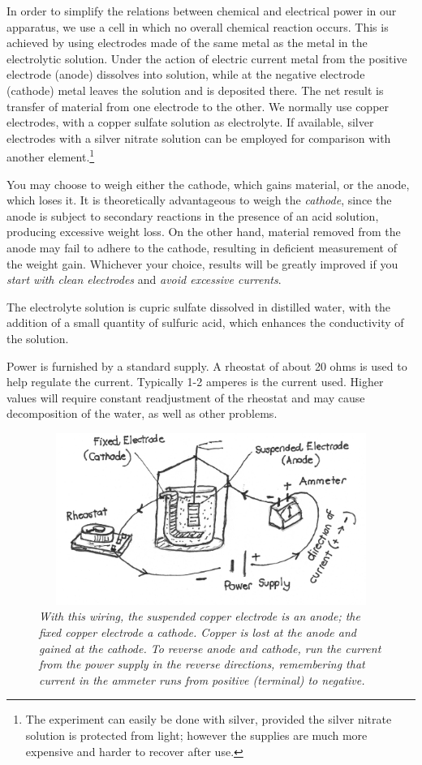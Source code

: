 In order to simplify the relations between chemical and electrical power
in our ap\-pa\-ra\-tus, we use a cell in which no overall chemical reaction
occurs. This is achieved by using electrodes made of the same metal as
the metal in the electrolytic solution. Under the action of electric
current metal from the positive electrode (anode) dissolves into
solution, while at the negative electrode (cathode) metal leaves the
solution and is deposited there. The net result is transfer of material
from one electrode to the other. We normally use copper electrodes, with
a copper sulfate solution as electrolyte. If available, silver
electrodes with a silver nitrate solution can be employed for comparison
with another element.\footnote{The experiment can easily be done with
  silver, provided the silver nitrate solution is protected from light;
  however the supplies are much more expensive and harder to recover
  after use.}

You may choose to weigh either the cathode, which gains material, or the
anode, which loses it. It is theoretically advantageous to weigh the
\emph{cathode}, since the anode is subject to secondary reactions in the
presence of an acid solution, producing excessive weight loss. On the
other hand, material removed from the anode may fail to adhere to the
cathode, resulting in deficient measurement of the weight gain.
Whichever your choice, results will be greatly improved if you
\emph{start with clean electrodes} and \emph{avoid excessive currents}.

The electrolyte solution is cupric sulfate dissolved in distilled water,
with the ad\-di\-tion of a small quantity of sulfuric acid, which enhances
the conductivity of the solution.

Power is furnished by a standard supply. A rheostat of about 20 ohms is
used to help regulate the current. Typically 1-2 amperes is the current
used. Higher values will require constant readjustment of the rheostat
and may cause de\-com\-po\-si\-tion of the water, as well as other problems.

\begin{figure}
\begin{center}
\includegraphics[width=4.88403in,height=2.20694in]{images/01_faraday/image003.png}
\caption*{\emph{With this wiring, the suspended copper electrode is an anode; the
fixed copper electrode a cathode. Copper is lost at the anode and gained at the cathode.
To reverse anode and cathode, run the current from the power
supply in the reverse directions, remembering that current in the
ammeter runs from positive (terminal) to negative.}}
\end{center}
\end{figure}

